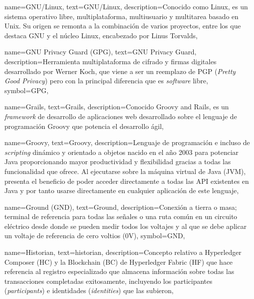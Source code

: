 {
    name={GNU/Linux},
    text={GNU/Linux},
    description={Conocido como Linux, es un sistema operativo libre, multiplataforma, multiusuario y multitarea basado en Unix. Su origen se remonta a la combinación de varios proyectos, entre los que destaca GNU y el núcleo Linux, encabezado por Linus Torvalds},
}

{
    name={GNU Privacy Guard (GPG)},
    text={GNU Privacy Guard},
    description={Herramienta multiplataforma de cifrado y firmas digitales desarrollado por Werner Koch, que viene a ser un reemplazo de PGP (\textit{Pretty Good Privacy}) pero con la principal diferencia que es \textit{software} libre},
    symbol={GPG},
}

{
    name={Grails},
    text={Grails},
    description={Conocido Groovy and Rails, es un \textit{framework} de desarrollo de aplicaciones web desarrollado sobre el lenguaje de programación Groovy que potencia el desarrollo ágil},
}

{
    name={Groovy},
    text={Groovy},
    description={Lenguaje de programación e incluso de \textit{scripting} dinámico y orientado a objetos nacido en el año 2003 para potenciar Java proporcionando mayor productividad y flexibilidad gracias a todas las funcionalidad que ofrece. Al ejecutarse sobre la máquina virtual de Java (JVM), presenta el beneficio de poder acceder directamente a todas las API existentes en Java y por tanto usarse directamente en cualquier aplicación de este lenguaje},
}

{
    name={Ground (GND)},
    text={Ground},
    description={Conexión a tierra o masa; terminal de referencia para todas las señales o una ruta común en un circuito eléctrico desde donde se pueden medir todos los voltajes y al que se debe aplicar un voltaje de referencia de cero voltios (0V)},
    symbol={GND},
}

{
    name={Historian},
    text={historian},
    description={Concepto relativo a Hyperledger Composer (HC) y la Blockchain (BC) de Hyperledger Fabric (HF) que hace referencia al registro especializado que almacena información sobre todas las transacciones completadas exitosamente, incluyendo los participantes (\textit{participants}) e identidades (\textit{identities}) que las subieron},
}

